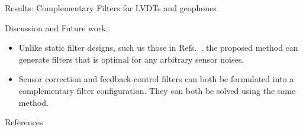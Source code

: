 \documentclass{beamer}
\begin{document}
\begin{frame}[t]
\begin{columns}[t]
\begin{column}{0.32\linewidth}
\begin{block}{Results: Complementary Filters for LVDTs and geophones}
			\end{block}
			\begin{block}{Discussion and Future work.}
				\begin{itemize}
					\item Unlike static filter designs, such us those in Refs.~\cite{Sekiguchi:2016bmv,vanHeijningen:2018cpc,low_frequency_optimization_and_performance_of_advanced_virgo_seismic_isolation_system}, the proposed method can generate filters that is optimal for any arbitrary sensor noises.
					\item Sensor correction and feedback-control filters can both be formulated into a complementary filter configuration. They can both be solved using the same method.
					
				\end{itemize}
			\end{block}
			\begin{block}{References}
				
				
			\end{block}
		\end{column}
	\end{columns}
\end{frame}
\end{document}
